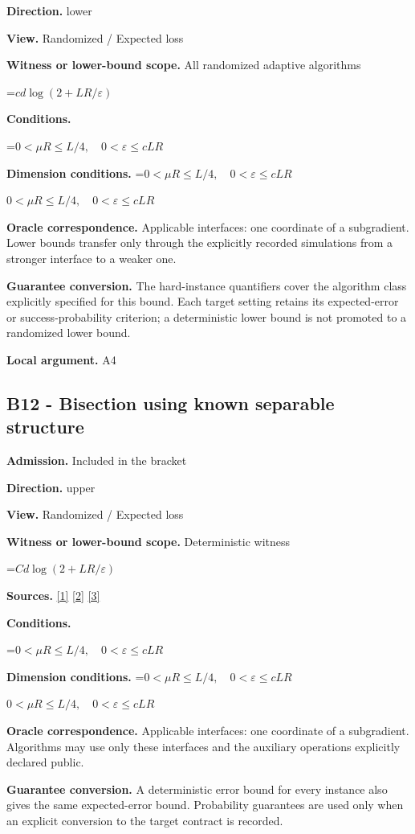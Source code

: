 \documentclass[10pt,a4paper]{article}
\newcommand{\AtlasMath}[1]{\par\begingroup\centering\setbox0=\hbox{$\displaystyle #1$}\ifdim\wd0>1.4\linewidth\typeout{ATLAS WIDE FORMULA: \the\wd0}\fi\ifdim\wd0>\linewidth\resizebox{\linewidth}{!}{\box0}\else\box0\fi\par\endgroup}
\newcommand{\AtlasInlineMath}[1]{\begingroup\setbox0=\hbox{$#1$}\ifdim\wd0>.4\linewidth\endgroup\AtlasMath{#1}\else\endgroup$#1$\fi}
\begin{document}
\textbf{Direction.} lower

\textbf{View.} Randomized / Expected loss

\textbf{Witness or lower-bound scope.} All randomized adaptive algorithms

\AtlasMath{cd\log(2+LR/\varepsilon)}
\textbf{Conditions.} 
\AtlasMath{0<\mu R\le L/4,\quad0<\varepsilon\le cLR}


\textbf{Dimension conditions.} \AtlasInlineMath{0<\mu R\le L/4,\quad0<\varepsilon\le cLR}

\textbf{Oracle correspondence.} Applicable interfaces: one coordinate of a subgradient. Lower bounds transfer only through the explicitly recorded simulations from a stronger interface to a weaker one.

\textbf{Guarantee conversion.} The hard-instance quantifiers cover the algorithm class explicitly specified for this bound. Each target setting retains its expected-error or success-probability criterion; a deterministic lower bound is not promoted to a randomized lower bound.

\textbf{Local argument.} A4

\subsection{B12 - Bisection using known separable structure}
\textbf{Admission.} Included in the bracket

\textbf{Direction.} upper

\textbf{View.} Randomized / Expected loss

\textbf{Witness or lower-bound scope.} Deterministic witness

\AtlasMath{Cd\log(2+LR/\varepsilon)}
\textbf{Sources.} \href{https://arxiv.org/pdf/1405.4980}{[1]} \href{https://www2.isye.gatech.edu/~nemirovs/MOR_AccuracyCertificates.pdf}{[2]} \href{https://arxiv.org/pdf/2609.20701}{[3]}

\textbf{Conditions.} 
\AtlasMath{0<\mu R\le L/4,\quad0<\varepsilon\le cLR}


\textbf{Dimension conditions.} \AtlasInlineMath{0<\mu R\le L/4,\quad0<\varepsilon\le cLR}

\textbf{Oracle correspondence.} Applicable interfaces: one coordinate of a subgradient. Algorithms may use only these interfaces and the auxiliary operations explicitly declared public.

\textbf{Guarantee conversion.} A deterministic error bound for every instance also gives the same expected-error bound. Probability guarantees are used only when an explicit conversion to the target contract is recorded.
\end{document}
